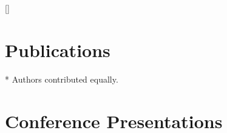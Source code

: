 \documentclass[11pt,a4paper,sans]{moderncv}        %
\begin{document}





[\refname]{} %
\section{Publications}
\nocite{*}
%
%  
\printbibliography
* Authors contributed equally.

\section{Conference Presentations}
\end{document}
